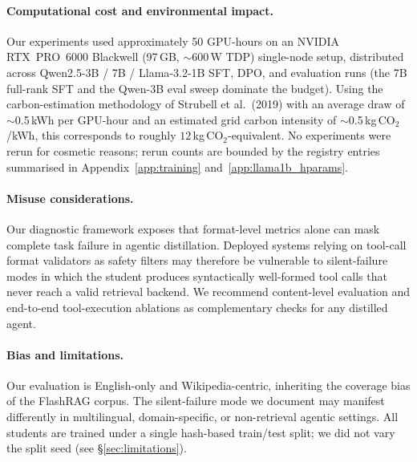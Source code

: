 \documentclass[11pt]{article}
\begin{document}
\paragraph{Computational cost and environmental impact.} Our experiments used approximately 50 GPU-hours on an NVIDIA RTX~PRO~6000 Blackwell (97\,GB, $\sim$600\,W TDP) single-node setup, distributed across Qwen2.5-3B / 7B / Llama-3.2-1B SFT, DPO, and evaluation runs (the 7B full-rank SFT and the Qwen-3B eval sweep dominate the budget). Using the carbon-estimation methodology of Strubell et al.\ (2019) with an average draw of $\sim$0.5\,kWh per GPU-hour and an estimated grid carbon intensity of $\sim$0.5\,kg\,CO$_2$/kWh, this corresponds to roughly $12$\,kg\,CO$_2$-equivalent. No experiments were rerun for cosmetic reasons; rerun counts are bounded by the registry entries summarised in Appendix~\ref{app:training} and~\ref{app:llama1b_hparams}.

\paragraph{Misuse considerations.} Our diagnostic framework exposes that format-level metrics alone can mask complete task failure in agentic distillation. Deployed systems relying on tool-call format validators as safety filters may therefore be vulnerable to silent-failure modes in which the student produces syntactically well-formed tool calls that never reach a valid retrieval backend. We recommend content-level evaluation and end-to-end tool-execution ablations as complementary checks for any distilled agent.

\paragraph{Bias and limitations.} Our evaluation is English-only and Wikipedia-centric, inheriting the coverage bias of the FlashRAG corpus. The silent-failure mode we document may manifest differently in multilingual, domain-specific, or non-retrieval agentic settings. All students are trained under a single hash-based train/test split; we did not vary the split seed (see \S\ref{sec:limitations}).




\end{document}
